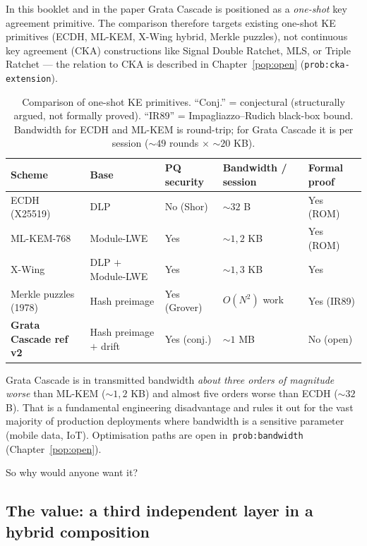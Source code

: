 \documentclass[11pt,a4paper]{article}
\begin{document}
\medskip

In this booklet and in the paper Grata Cascade is positioned as a \emph{one-shot} key agreement primitive. The comparison therefore targets existing one-shot KE primitives (ECDH, ML-KEM, X-Wing hybrid, Merkle puzzles), not continuous key agreement (CKA) constructions like Signal Double Ratchet, MLS, or Triple Ratchet --- the relation to CKA is described in Chapter~\ref{pop:open} (\texttt{prob:cka-extension}).

\begin{table}[ht]
\centering
\small
\begin{tabular}{lllll}
\toprule
Scheme & Base & PQ security & Bandwidth / session & Formal proof \\
\midrule
ECDH (X25519) & DLP & No (Shor) & $\sim 32$ B & Yes (ROM) \\
ML-KEM-768 & Module-LWE & Yes & $\sim 1{,}2$ KB & Yes (ROM) \\
X-Wing & DLP $+$ Module-LWE & Yes & $\sim 1{,}3$ KB & Yes \\
Merkle puzzles (1978) & Hash preimage & Yes (Grover) & $O(N^2)$ work & Yes (IR89) \\
\textbf{Grata Cascade ref v2} & Hash preimage $+$ drift & Yes (conj.) & $\sim 1$ MB & No (open) \\
\bottomrule
\end{tabular}
\caption{Comparison of one-shot KE primitives. ``Conj.'' = conjectural (structurally argued, not formally proved). ``IR89'' = Impagliazzo--Rudich black-box bound. Bandwidth for ECDH and ML-KEM is round-trip; for Grata Cascade it is per session ($\sim 49$ rounds $\times$ $\sim 20$ KB).}
\label{tab:pop-comparison}
\end{table}

Grata Cascade is in transmitted bandwidth \emph{about three orders of magnitude worse} than ML-KEM ($\sim 1{,}2$ KB) and almost five orders worse than ECDH ($\sim 32$ B). That is a fundamental engineering disadvantage and rules it out for the vast majority of production deployments where bandwidth is a sensitive parameter (mobile data, IoT). Optimisation paths are open in~\texttt{prob:bandwidth} (Chapter~\ref{pop:open}).

So why would anyone want it?

\subsection{The value: a third independent layer in a hybrid composition}
\end{document}
